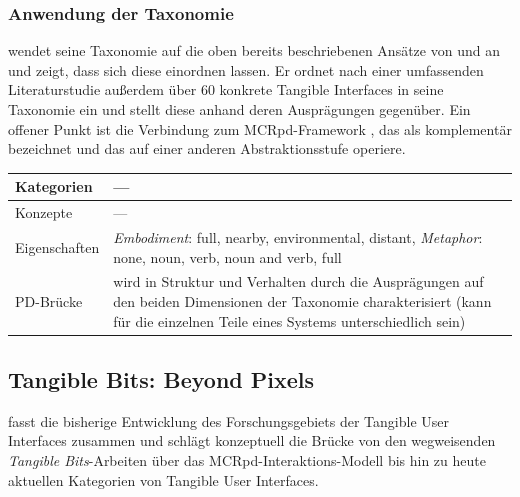 \subsubsection{Anwendung der Taxonomie}
\citeauthor{Fishkin04} wendet seine Taxonomie auf die oben bereits beschriebenen Ansätze von \citep{Holmquist99} und \citep{Underkoffler99} an und zeigt, dass sich diese einordnen lassen. Er ordnet nach einer umfassenden Literaturstudie außerdem über 60 konkrete Tangible Interfaces in seine Taxonomie ein und stellt diese anhand deren Ausprägungen gegenüber. Ein offener Punkt ist die Verbindung zum \gls{MCRpd}-Framework \citep{Ullmer00}, das \citeauthor{Fishkin04} als komplementär bezeichnet und das auf einer anderen Abstraktionsstufe operiere. 
\\[1em]
\begin{tabular}{| p{3cm} | p{10cm} |}
  \hline
  Kategorien & --- \\ \hline
  Konzepte & --- \\ \hline
  Eigenschaften & \emph{Embodiment}: full, nearby, environmental, distant, \emph{Metaphor}: none, noun, verb, noun and verb, full\\ \hline
  PD-Brücke & wird in Struktur und Verhalten durch die Ausprägungen auf den beiden Dimensionen der Taxonomie charakterisiert (kann für die einzelnen Teile eines Systems unterschiedlich sein)  \\ \hline
\end{tabular} 


\subsection{Tangible Bits: Beyond Pixels} %
\label{sub:tangible_bits_beyond_pixels}

\citet{Ishii08} fasst die bisherige Entwicklung des Forschungsgebiets der Tangible User Interfaces zusammen und schlägt konzeptuell die Brücke von den wegweisenden \emph{Tangible Bits}-Arbeiten über das MCRpd-Interaktions-Modell bis hin zu heute aktuellen Kategorien von Tangible User Interfaces.

